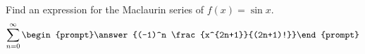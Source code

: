 \documentclass{ximera}
\author{Gregory Hartman \and Matthew Carr}
\begin{document}
\begin{exercise}






Find an expression for the Maclaurin series of $f(x)=\sin x$.
\[
\sum_{n=0}^{\infty}\begin{prompt}\answer{(-1)^n \frac{x^{2n+1}}{(2n+1)!}}\end{prompt}
\]

\end{exercise}
\end{document}
